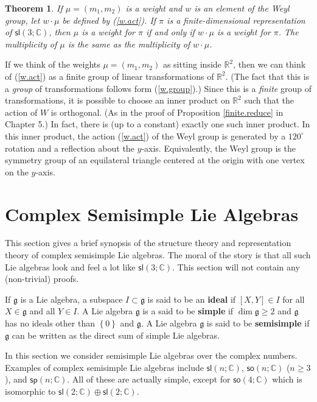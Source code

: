 \documentclass{amsbook}
\let \frak = \mathfrak
\theoremstyle{plain}
\newtheorem{theorem}{Theorem}
\numberwithin{equation}{chapter}
\numberwithin{theorem}{chapter}
\begin{document}
\begin{theorem}
If $\mu=(m_{1},m_{2})$ is a weight and $w$ is an element of the Weyl group,
let $w\cdot\mu$ be defined by (\ref{w.act}). If $\pi$ is a finite-dimensional
representation of $\mathsf{sl}\left(  3;\mathbb{C}\right)  $, then $\mu$ is a
weight for $\pi$ if and only if $w\cdot\mu$ is a weight for $\pi$. The
multiplicity of $\mu$ is the same as the multiplicity of $w\cdot\mu$.
\end{theorem}

If we think of the weights $\mu=(m_{1},m_{2})$ as sitting inside
$\mathbb{R}^{2}$, then we can think of (\ref{w.act}) as a finite group of
linear transformations of $\mathbb{R}^{2}$. (The fact that this is a
\textit{group} of transformations follows form (\ref{w.group}).) Since this is
a \textit{finite} group of transformations, it is possible to choose an inner
product on $\mathbb{R}^{2}$ such that the action of $W$ is orthogonal. (As in
the proof of Proposition \ref{finite.reduce} in Chapter 5.) In fact, there is
(up to a constant) exactly one such inner product. In this inner product, the
action (\ref{w.act}) of the Weyl group is generated by a $120^{\circ}$
rotation and a reflection about the $y$-axis. Equivalently, the Weyl group is
the symmetry group of an equilateral triangle centered at the origin with one
vertex on the $y$-axis.

\section{Complex Semisimple Lie Algebras}

This section gives a brief synopsis of the structure theory and representation
theory of complex semisimple Lie algebras. The moral of the story is that all
such Lie algebras look and feel a lot like $\mathsf{sl}\left(  3;\mathbb{C}%
\right)  $. This section will not contain any (non-trivial) proofs.

If $\frak{g}$ is a Lie algebra, a subspace $I\subset\frak{g}$ is said to be an
\textbf{ideal} if $\left[  X,Y\right]  \in I$ for all $X\in\frak{g}$ and all
$Y\in I$. A Lie algebra $\frak{g}$ is a said to be \textbf{simple} if
$\dim\frak{g}\geq2$ and $\frak{g}$ has no ideals other than $\left\{
0\right\}  $ and $\frak{g}$. A Lie algebra $\frak{g}$ is said to be
\textbf{semisimple} if $\frak{g}$ can be written as the direct sum of simple
Lie algebras.

In this section we consider semisimple Lie algebras over the complex numbers.
Examples of complex semisimple Lie algebras include $\mathsf{sl}\left(
n;\mathbb{C}\right)  $, $\mathsf{so}(n;\mathbb{C})$ ($n\geq3$), and
$\mathsf{sp}(n;\mathbb{C})$. All of these are actually simple, except for
$\mathsf{so}(4;\mathbb{C})$ which is isomorphic to $\mathsf{sl}(2;\mathbb{C}%
)\oplus\mathsf{sl}(2;\mathbb{C})$.
\end{document}
